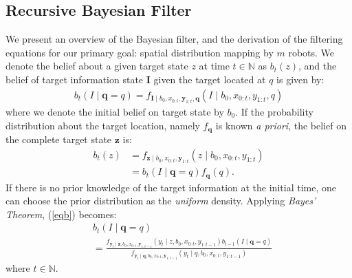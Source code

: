 \documentclass[letterpaper, 10 pt, conference]{ieeeconf}
\newcommand{\Ram}[1]{{\normalsize{\textbf{({\color{green}Ram:\ }#1)}}}}
\begin{document}
\subsection{Recursive Bayesian Filter}
We present an overview of the Bayesian filter, and the derivation of the filtering equations for our primary goal: spatial distribution mapping by $m$ robots. 
We denote the belief about a given target state $z$ at time $t \in \mathbb{N}$ as $b_t(z)$, and the belief of target information state $\bm{I}$ given the target located at $q$ is given by:
\begin{align}
b_t(I \mid \bm{q} = q)= f_{\bm{I}\mid b_0,{x}_{0:t},\bm{y}_{1:t},\bm{q}}\left(I \mid b_0,{x}_{0:t},y_{1:t},q\right)
\label{eqb}
\end{align}
where we denote the initial belief on target state by $b_0$.
If the probability distribution about the target location, namely $f_{\bm{q}}$ is known \emph{a priori}, the belief on the complete target state $\bm{z}$ is:
\begin{align}
b_t(z)&=
f_{\bm{z} \mid b_0,{x}_{0:t},\bm{y}_{1:t}}
\left(
z \mid b_0,
{x}_{0:t},y_{1:t}
\right) \nonumber  \\
&=
b_t(I\mid \bm{q}=q)f_{\bm{q}}(q). 
\label{eq0}
\end{align}
If there is no prior knowledge of the target information at the initial time, one can choose the prior distribution as the \emph{uniform} density. 
Applying \emph{Bayes' Theorem}, (\ref{eqb}) becomes:
{\small{
\begin{align*}
&b_{t}(I \mid \bm{q} =q)\\
&=
\frac{
	f_{\bm{y}_{t} \mid
\bm{z},b_0,
{x}_{0:t},\bm{y}_{1:t-1}	
}\left(
	y_{t} \mid
	z,b_0,
	{x}_{0:t},y_{1:t-1}
\right)
b_{t-1}(I\mid \bm{q} = q)
}
{
f_{\bm{y}_{t} \mid
		\bm{q},
		b_0,
		{x}_{0:t},\bm{y}_{1:t-1}	
	}\left(
	y_{t} \mid
	q,b_0,
	{x}_{0:t},y_{1:t-1}
	\right)
}
\end{align*}}}where $t \in \mathbb{N}$.
\end{document}
